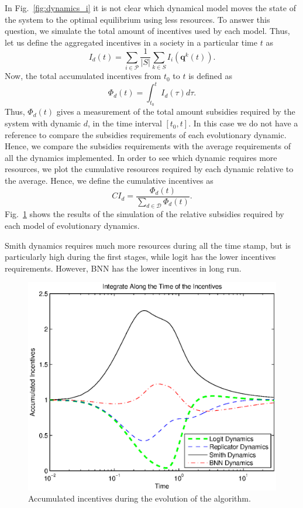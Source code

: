 \documentclass[a4paper,10pt]{article}
\newcommand{\bs}[1]{\boldsymbol{#1}}
\begin{document}
In Fig.~\ref{fig:dynamics_i} it is not clear which dynamical model moves the state of the system to the optimal equilibrium using less resources. To answer this question, we simulate the total amount of incentives used by each model.
Thus, let us define the aggregated incentives in a society in a particular time $t$ as
\begin{equation}
 I_d (t) = \sum_{i\in\mathcal{P}} \frac{1}{|S|} \sum_{k\in S} I_i \left( \bs{q}^k (t) \right).
\end{equation}
Now, the total accumulated incentives from $t_0$ to $t$ is defined as 
\begin{equation}
 \varPhi_d (t) = \int_{t_0}^t I_d (\tau) d\tau.
\end{equation}
Thus, $\varPhi_d (t)$ gives a measurement of the total amount subsidies required by the system with dynamic $d$, in the time interval  $[t_0, t]$.
In this case we do not have a reference to compare the subsidies requirements of each evolutionary dynamic. Hence, we compare the subsidies requirements with the average requirements of all the dynamics implemented. 
%
In order to see which dynamic requires more resources, we plot the cumulative resources required by each dynamic relative to the average.
Hence, we define the cumulative incentives as 
%
\begin{equation}
CI_d = \frac{ \varPhi_d (t) }{ \sum_{d\in \mathcal{D}} \varPhi_d (t) }.
\end{equation}
%
Fig.~\ref{fig:integral} shows the results of the simulation of the relative subsidies required by each model of evolutionary dynamics.
%



Smith dynamics requires much more resources during all the time stamp, but is particularly high during the first stages, while logit has the lower incentives requirements. However, BNN has the lower incentives in long run.

\begin{figure}[hbt]
 \centering
 \includegraphics[width=.75\textwidth]{./images/accumulated_i.eps}
 \caption{Accumulated incentives during the evolution of the algorithm.}
 \label{fig:integral}
\end{figure}
\end{document}
